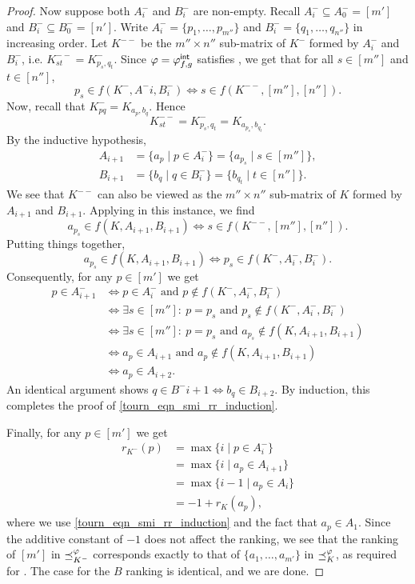 \begin{proof}
    Now suppose both $A^-_i$ and $B^-_i$ are non-empty. Recall $A^-_i \subseteq
    A^-_0 = [m']$ and $B^-_i \subseteq B^-_0 = [n']$. Write $A^-_i = \{p_1,
    \ldots, p_{m''}\}$ and $B^-_i = \{q_1, \ldots, q_{n''}\}$ in increasing
    order. Let $K^{--}$ be the $m'' \times n''$ sub-matrix of $K^-$ formed by
    $A^-_i$ and $B^-_i$, i.e. $K^{--}_{st} = K^-_{p_s, q_t}$. Since $\varphi =
    {\varphi_{f, g}^\mathsf{int}}$ satisfies \smi{}, we get that for all $s \in [m'']$
    and $t \in [n'']$,
    \[
        p_s \in f(K^-, A^-i, B^-_i) \iff s \in f(K^{--}, [m''], [n'']).
    \]
    Now, recall that $K^-_{pq} = K_{a_p, b_q}$. Hence
    \[
        K^{--}_{st} = K^-_{p_s, q_t} = K_{a_{p_s}, b_{q_t}}.
    \]
    By the inductive hypothesis,
    \begin{align*}
        A_{i + 1} &= \{a_p \mid p \in A^-_i\} = \{a_{p_s} \mid s \in [m'']\}, \\
        B_{i + 1} &= \{b_q \mid q \in B^-_i\} = \{b_{q_t} \mid t \in [n'']\}.
    \end{align*}
    We see that $K^{--}$ can also be viewed as the $m'' \times n''$ sub-matrix
    of $K$ formed by $A_{i + 1}$ and $B_{i + 1}$. Applying \smi{} in
    this instance, we find
    \[
        a_{p_s} \in f(K, A_{i + 1}, B_{i + 1})
            \iff s \in f(K^{--}, [m''], [n'']).
    \]
    Putting things together,
    \[
        a_{p_s} \in f(K, A_{i + 1}, B_{i + 1})
            \iff p_s \in f(K^-, A^-_i, B^-_i).
    \]
    Consequently, for any $p \in [m']$ we get
    \begin{align*}
        p \in A^-_{i + 1}
        &\iff p \in A^-_i \text{ and } p \notin f(K^-, A^-_i, B^-_i) \\
        &\iff \exists s \in [m'']:\ p = p_s \text{ and } p_s \notin f(K^-, A^-_i, B^-_i) \\
        &\iff \exists s \in [m'']:\ p = p_s \text{ and } a_{p_s} \notin f(K, A_{i + 1}, B_{i + 1}) \\
        &\iff a_p \in A_{i + 1} \text{ and } a_p \notin f(K, A_{i + 1}, B_{i + 1}) \\
        &\iff a_p \in A_{i + 2}.
    \end{align*}
    An identical argument shows $q \in B^-{i + 1} \iff b_q \in B_{i + 2}$. By
    induction, this
    completes the proof of \cref{tourn_eqn_smi_rr_induction}.

    Finally, for any $p \in [m']$ we get
    \begin{align*}
        r_{K^-}(p)
        &= \max\{i \mid p \in A^-_i\} \\
        &= \max\{i \mid a_p \in A_{i + 1}\} \\
        &= \max\{i - 1\mid a_p \in A_i\} \\
        &= -1 + r_K(a_p),
    \end{align*}
    where we use \cref{tourn_eqn_smi_rr_induction} and the fact that $a_p
    \in A_1$. Since the additive constant of $-1$ does not affect the ranking,
    we see that the ranking of $[m']$ in $\preceq_{K^-}^\varphi$ corresponds exactly
    to that of $\{a_1, \ldots, a_{m'}\}$ in $\preceq_K^\varphi$, as required for
    \rankremoval{}. The case for the $B$ ranking is identical, and we
    are done.


\end{proof}
